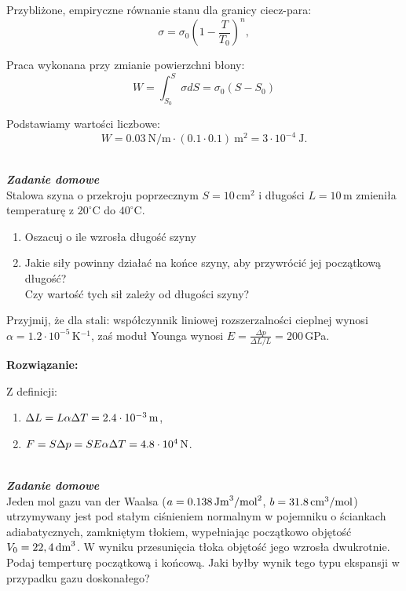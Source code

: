\documentclass[11pt,a4paper]{article}
\newcounter{zaddom}\newcommand{\zaddom}[1][]{\addtocounter{zaddom}{1} ~\\  {\bf \emph{Zadanie domowe \arabic{zaddom} #1 }} \\}
\renewcommand{\t}[1]{\textrm{#1}}
\begin{document}
Przybliżone, empiryczne równanie stanu dla granicy ciecz-para:
\begin{equation}
	\sigma = \sigma_0 \left(1 - \frac{T}{T_0}\right)^{n},
\end{equation}

Praca wykonana przy zmianie powierzchni błony:
\begin{equation}
	W = \int_{S_0}^{S} \sigma dS = \sigma_0 (S - S_0)
\end{equation}

Podstawiamy wartości liczbowe:
\begin{equation}
	W = 0.03~\t{N/m} \cdot (0.1 \cdot 0.1)~\t{m}^{2} = 3 \cdot 10^{-4}~\t{J}.
\end{equation}



\newpage
\zaddom
Stalowa szyna o przekroju poprzecznym $S = 10\,$cm$^2$ i długości $L = 10\,$m zmieniła temperaturę
z $20^\circ$C do $40^\circ$C.
\begin{enumerate}
\item Oszacuj o ile wzrosła długość szyny
\item Jakie siły powinny działać na końce szyny, aby przywrócić jej początkową długość? \\
      Czy wartość tych sił zależy od długości szyny?
\end{enumerate}
Przyjmij, że dla stali: współczynnik liniowej rozszerzalności cieplnej wynosi $\alpha = 1.2\cdot 10^{-5}\,$K$^{-1}$,
zaś moduł Younga wynosi $\displaystyle E = \frac{\Delta p}{\Delta L/L} = 200\,$GPa.

\vskip 10pt
\textbf{Rozwiązanie:}

Z definicji:
\begin{enumerate}
\item $\Delta L = L \alpha \Delta T = 2.4 \cdot 10^{-3}\, {\rm m}$,
\item $F = S \Delta p = S E \alpha \Delta T = 4.8 \cdot 10^4\, {\rm N}$.
\end{enumerate}
\newpage
\zaddom
Jeden mol gazu van der Waalsa ($a=0.138\,\rm{Jm}^3/\rm{mol}^2$, $b=31.8\,\rm{cm^3/mol}$)
utrzymywany jest pod stałym ciśnieniem normalnym w pojemniku o ściankach adiabatycznych, zamkniętym tłokiem,
wypełniając początkowo objętość $V_0=22,4\,\rm{dm}^3$.
W wyniku przesunięcia tłoka objętość jego wzrosła dwukrotnie. Podaj temperturę początkową i końcową.  
Jaki byłby wynik tego typu ekspansji w przypadku gazu doskonałego?
\end{document}
